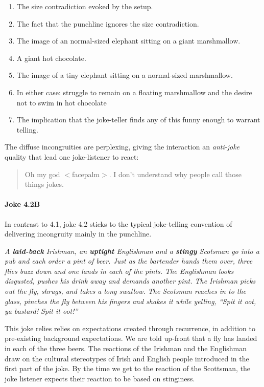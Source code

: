 \documentclass[a4]{scrartcl}
\begin{document}
\begin{enumerate}
  \item The size contradiction evoked by the setup.
  \item The fact that the punchline ignores the size contradiction.
  \item The image of an normal-sized elephant sitting on a giant marshmallow.
  \item A giant hot chocolate. 
  \item The image of a tiny elephant sitting on a normal-sized marshmallow.
  \item In either case: struggle to remain on a floating marshmallow and the desire not to swim in hot chocolate 
  \item The implication that the joke-teller finds any of this funny enough to warrant telling.
\end{enumerate}
The diffuse incongruities are perplexing, giving the interaction an \emph{anti-joke} quality
that lead one joke-listener to react:

\begin{quote}
Oh my god $<$facepalm$>$. I don't understand why people call those things jokes.
\end{quote}

\paragraph{Joke 4.2B} In contrast to 4.1, joke 4.2 sticks to the typical joke-telling convention
of delivering incongruity mainly in the punchline.

\begin{center}
\begin{tcolorbox}[title=Joke 4.2B]
  \textit{A \textbf{laid-back} Irishman, an \textbf{uptight} Englishman and a \textbf{stingy} Scotsman go into a pub and each order a pint of beer. Just as the bartender hands them over, three flies buzz down and one lands in each of the pints. The Englishman looks disgusted, pushes his drink away and demands another pint. The Irishman picks out the fly, shrugs, and takes a long swallow. The Scotsman reaches in to the glass, pinches the fly between his fingers and shakes it while yelling, ``Spit it oot, ya bastard! Spit it oot!''}
\end{tcolorbox}
\end{center}

This joke relies relies on expectations created through recurrence,
in addition to pre-existing background expectations.
We are told up-front that a fly has landed in each of the three beers.
The reactions of the Irishman and the Englishman draw on the cultural stereotypes 
of Irish and English people introduced in the first part of the joke.
By the time we get to the reaction of the Scottsman,
the joke listener expects their reaction to be based on stinginess.
\end{document}
